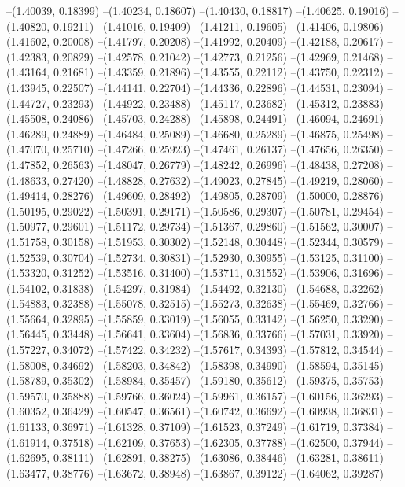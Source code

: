 --(1.40039, 0.18399)
--(1.40234, 0.18607)
--(1.40430, 0.18817)
--(1.40625, 0.19016)
--(1.40820, 0.19211)
--(1.41016, 0.19409)
--(1.41211, 0.19605)
--(1.41406, 0.19806)
--(1.41602, 0.20008)
--(1.41797, 0.20208)
--(1.41992, 0.20409)
--(1.42188, 0.20617)
--(1.42383, 0.20829)
--(1.42578, 0.21042)
--(1.42773, 0.21256)
--(1.42969, 0.21468)
--(1.43164, 0.21681)
--(1.43359, 0.21896)
--(1.43555, 0.22112)
--(1.43750, 0.22312)
--(1.43945, 0.22507)
--(1.44141, 0.22704)
--(1.44336, 0.22896)
--(1.44531, 0.23094)
--(1.44727, 0.23293)
--(1.44922, 0.23488)
--(1.45117, 0.23682)
--(1.45312, 0.23883)
--(1.45508, 0.24086)
--(1.45703, 0.24288)
--(1.45898, 0.24491)
--(1.46094, 0.24691)
--(1.46289, 0.24889)
--(1.46484, 0.25089)
--(1.46680, 0.25289)
--(1.46875, 0.25498)
--(1.47070, 0.25710)
--(1.47266, 0.25923)
--(1.47461, 0.26137)
--(1.47656, 0.26350)
--(1.47852, 0.26563)
--(1.48047, 0.26779)
--(1.48242, 0.26996)
--(1.48438, 0.27208)
--(1.48633, 0.27420)
--(1.48828, 0.27632)
--(1.49023, 0.27845)
--(1.49219, 0.28060)
--(1.49414, 0.28276)
--(1.49609, 0.28492)
--(1.49805, 0.28709)
--(1.50000, 0.28876)
--(1.50195, 0.29022)
--(1.50391, 0.29171)
--(1.50586, 0.29307)
--(1.50781, 0.29454)
--(1.50977, 0.29601)
--(1.51172, 0.29734)
--(1.51367, 0.29860)
--(1.51562, 0.30007)
--(1.51758, 0.30158)
--(1.51953, 0.30302)
--(1.52148, 0.30448)
--(1.52344, 0.30579)
--(1.52539, 0.30704)
--(1.52734, 0.30831)
--(1.52930, 0.30955)
--(1.53125, 0.31100)
--(1.53320, 0.31252)
--(1.53516, 0.31400)
--(1.53711, 0.31552)
--(1.53906, 0.31696)
--(1.54102, 0.31838)
--(1.54297, 0.31984)
--(1.54492, 0.32130)
--(1.54688, 0.32262)
--(1.54883, 0.32388)
--(1.55078, 0.32515)
--(1.55273, 0.32638)
--(1.55469, 0.32766)
--(1.55664, 0.32895)
--(1.55859, 0.33019)
--(1.56055, 0.33142)
--(1.56250, 0.33290)
--(1.56445, 0.33448)
--(1.56641, 0.33604)
--(1.56836, 0.33766)
--(1.57031, 0.33920)
--(1.57227, 0.34072)
--(1.57422, 0.34232)
--(1.57617, 0.34393)
--(1.57812, 0.34544)
--(1.58008, 0.34692)
--(1.58203, 0.34842)
--(1.58398, 0.34990)
--(1.58594, 0.35145)
--(1.58789, 0.35302)
--(1.58984, 0.35457)
--(1.59180, 0.35612)
--(1.59375, 0.35753)
--(1.59570, 0.35888)
--(1.59766, 0.36024)
--(1.59961, 0.36157)
--(1.60156, 0.36293)
--(1.60352, 0.36429)
--(1.60547, 0.36561)
--(1.60742, 0.36692)
--(1.60938, 0.36831)
--(1.61133, 0.36971)
--(1.61328, 0.37109)
--(1.61523, 0.37249)
--(1.61719, 0.37384)
--(1.61914, 0.37518)
--(1.62109, 0.37653)
--(1.62305, 0.37788)
--(1.62500, 0.37944)
--(1.62695, 0.38111)
--(1.62891, 0.38275)
--(1.63086, 0.38446)
--(1.63281, 0.38611)
--(1.63477, 0.38776)
--(1.63672, 0.38948)
--(1.63867, 0.39122)
--(1.64062, 0.39287)
